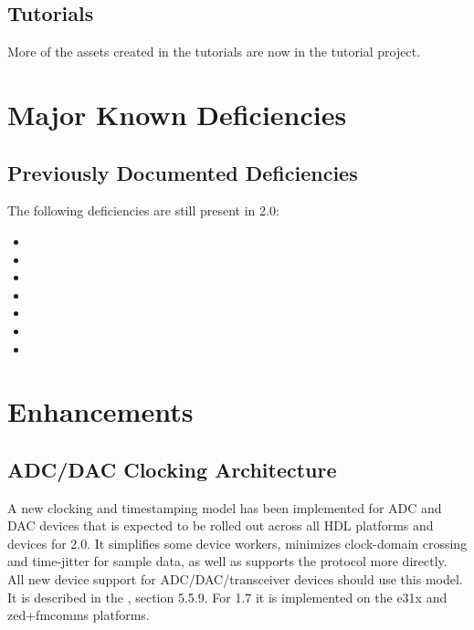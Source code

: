 \subsection{Tutorials}
\label{sec:20_tutorials}
More of the assets created in the tutorials are now in the tutorial project.

\section{Major Known Deficiencies}
\label{sec:20_bugs}

\subsection{Previously Documented Deficiencies}
The following deficiencies are still present in 2.0:
\begin{itemize}
\setlength\itemsep{0em} %
\item {}
\item {}
\item {}
\item {}
\item {}
\item {}
\item {}
\end{itemize}


\def\ocpiversion{v1.7.0}
\section{Enhancements}
\subsection{ADC/DAC Clocking Architecture}
\label{sec:17_adc_dac}
A new clocking and timestamping model has been implemented for ADC and DAC devices that is expected to be rolled out across all HDL platforms and devices for 2.0.  It simplifies some device workers, minimizes clock-domain crossing and time-jitter for sample data, as well as supports the  protocol more directly. All new device support for ADC/DAC/transceiver devices should use this model.  It is described in the , section 5.5.9.  For 1.7 it is implemented on the e31x and zed+fmcomms platforms.

